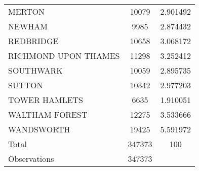 {\begin{longtable}{l*{1}{cc}}
MERTON              &       10079&    2.901492\\
NEWHAM              &        9985&    2.874432\\
REDBRIDGE           &       10658&    3.068172\\
RICHMOND UPON THAMES&       11298&    3.252412\\
SOUTHWARK           &       10059&    2.895735\\
SUTTON              &       10342&    2.977203\\
TOWER HAMLETS       &        6635&    1.910051\\
WALTHAM FOREST      &       12275&    3.533666\\
WANDSWORTH          &       19425&    5.591972\\
Total               &      347373&         100\\
\midrule
Observations        &      347373&            \\
\bottomrule
\end{longtable}
}
